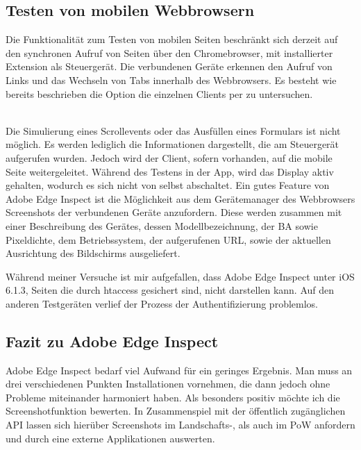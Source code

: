 		\subsection{Testen von mobilen \Gls{Webbrowser}n}
		Die Funktionalität zum Testen von mobilen Seiten beschränkt sich derzeit auf den synchronen Aufruf von Seiten über den Chromebrowser, mit installierter Extension als Steuergerät. Die verbundenen Geräte erkennen den Aufruf von Links und das Wechseln von Tabs innerhalb des \Gls{Webbrowser}s. Es besteht wie bereits beschrieben die Option die einzelnen Clients per  zu untersuchen.
		
		\\Die Simulierung eines Scrollevents oder das Ausfüllen eines Formulars ist nicht möglich. Es werden lediglich die Informationen dargestellt, die am Steuergerät aufgerufen wurden. Jedoch wird der Client, sofern vorhanden, auf die mobile Seite weitergeleitet. Während des Testens in der \Gls{App}, wird das Display aktiv gehalten, wodurch es sich nicht von selbst abschaltet. Ein gutes Feature von Adobe Edge Inspect ist die Möglichkeit aus dem Gerätemanager des \Gls{Webbrowser}s Screenshots der verbundenen Geräte anzufordern. Diese werden zusammen mit einer Beschreibung des Gerätes, dessen Modellbezeichnung, der \Gls{BA} sowie \Gls{Pixel}dichte, dem Betriebssystem, der aufgerufenen URL, sowie der aktuellen Ausrichtung des Bildschirms ausgeliefert.
		
		Während meiner Versuche ist mir aufgefallen, dass Adobe Edge Inspect unter iOS 6.1.3, Seiten die durch \Gls{htaccess} 				gesichert sind, nicht darstellen kann. Auf den anderen Testgeräten verlief der Prozess der Authentifizierung problemlos. 
		
		\pagebreak
		\subsection{Fazit zu Adobe Edge Inspect}
		Adobe Edge Inspect bedarf viel Aufwand für ein geringes Ergebnis. Man muss an drei verschiedenen Punkten Installationen vornehmen, die dann jedoch \mbox{ohne} Probleme miteinander harmoniert haben. Als besonders positiv möchte ich die Screenshotfunktion bewerten. In Zusammenspiel mit der öffentlich zugänglichen API lassen sich hierüber Screenshots im Landschafts-, als auch im \Gls{PoW} anfordern und durch eine externe \Gls{App}likationen auswerten. 
		
